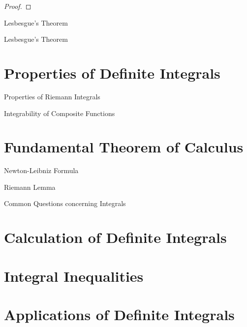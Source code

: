 \documentclass[11pt]{../../TexTemplate/elegantbook}
\begin{document}
\begin{proof}
    
\end{proof}

\begin{leftbarTitle}{Lesbesgue's Theorem}\end{leftbarTitle}

\begin{theorem}{Lesbesgue's Theorem}
    
\end{theorem}


\section{Properties of Definite Integrals}
\begin{leftbarTitle}{Properties of Riemann Integrals}\end{leftbarTitle}

\begin{leftbarTitle}{Integrability of Composite Functions}\end{leftbarTitle}


\section{Fundamental Theorem of Calculus}
\begin{leftbarTitle}{Newton-Leibniz Formula}\end{leftbarTitle}

\begin{leftbarTitle}{Riemann Lemma}\end{leftbarTitle}

\begin{leftbarTitle}{Common Questions concerning Integrals}\end{leftbarTitle}

\section{Calculation of Definite Integrals}

\section{Integral Inequalities}

\section{Applications of Definite Integrals}
\end{document}
